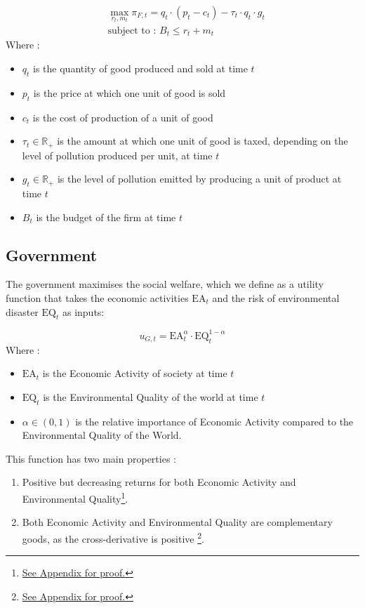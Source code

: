 \documentclass{article}
\begin{document}
\begin{equation}
    \begin{split}
        &\max_{r_{t},m_{t}}{\pi_{F,t}=q_{t}\cdot\left(p_{t}-c_{t}\right)-\tau_{t}\cdot q_{t}\cdot g_{t}} \\
        &\text{subject to : } B_{t} \leq r_{t} + m_{t}
    \end{split}
\end{equation}
Where : 
\begin{itemize}
    \item $q_{t}$ is the quantity of good produced and sold at time $t$
    \item $p_{t}$ is the price at which one unit of good is sold
    \item $c_{t}$ is the cost of production of a unit of good
    \item $\tau_{t}\in\mathbb{R}_{+}$ is the amount at which one unit of good is taxed, depending on the level of pollution produced per unit, at time $t$
    \item $g_{t}\in\mathbb{R}_{+}$ is the level of pollution emitted by producing a unit of product at time $t$
    \item $B_{t}$ is the budget of the firm at time $t$
\end{itemize}

\subsection{Government}
The government maximises the social welfare, which we define as a utility function that takes the  economic activities $\text{EA}_{t}$ and the risk of environmental disaster $\text{EQ}_{t}$ as inputs: 

\begin{equation}
    u_{G,t}=\text{EA}_{t}^{\alpha}\cdot\text{EQ}_{t}^{1-\alpha}
\end{equation}
Where : 
\begin{itemize}
    \item $\text{EA}_{t}$ is the Economic Activity of society at time $t$
    \item $\text{EQ}_{t}$ is the Environmental Quality of the world at time $t$
    \item $\alpha \in \left(0,1\right)$ is the relative importance of Economic Activity compared to the Environmental Quality of the World.
\end{itemize}
This function has two main properties : 

\begin{enumerate}
    \item Positive but decreasing returns for both Economic Activity and Environmental Quality\footnote{\hyperref[sec:properties_utility_function_gov_1]{See Appendix for proof.}}.
    \item Both Economic Activity and Environmental Quality are complementary goods, as the cross-derivative is positive \footnote{\hyperref[sec:properties_utility_function_gov_2]{See Appendix for proof.}}.
\end{enumerate}
\end{document}
